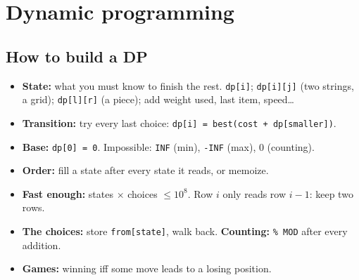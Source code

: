 \section{Dynamic programming}

\subsection{How to build a DP}\label{t:dp}
\begin{tip}
\begin{itemize}
\item \textbf{State:} what you must know to finish the rest. \texttt{dp[i]}; \texttt{dp[i][j]}
  (two strings, a grid); \texttt{dp[l][r]} (a piece); add weight used, last item, speed\dots
\item \textbf{Transition:} try every last choice: \texttt{dp[i] = best(cost + dp[smaller])}.
\item \textbf{Base:} \texttt{dp[0] = 0}. Impossible: \texttt{INF} (min), \texttt{-INF} (max),
  0 (counting).
\item \textbf{Order:} fill a state after every state it reads, or memoize.
\item \textbf{Fast enough:} states $\times$ choices $\le 10^8$. Row $i$ only reads row
  $i - 1$: keep two rows.
\item \textbf{The choices:} store \texttt{from[state]}, walk back.
  \textbf{Counting:} \texttt{\% MOD} after every addition.
\item \textbf{Games:} winning iff some move leads to a losing position.
\end{itemize}
\end{tip}



\label{t:knapsack}


